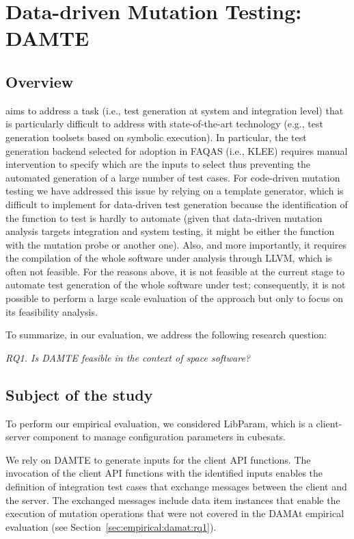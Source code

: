 \clearpage
\section{Data-driven Mutation Testing: DAMTE}
\label{sec:testGeneration:dataDriven}

\subsection{Overview}

\DAMTE aims to address a task (i.e., test generation at system and integration level) that is particularly difficult to address with state-of-the-art technology (e.g., test generation toolsets based on symbolic execution). In particular, the test generation backend selected for adoption in FAQAS (i.e., KLEE) requires manual intervention to specify which are the inputs to select thus preventing the automated generation of a large number of test cases. For code-driven mutation testing we have addressed this issue by relying on a template generator, which is difficult to implement for data-driven test generation because the identification of the function to test is hardly to automate (given that data-driven mutation analysis targets integration and system testing, it might be either the function with the mutation probe or another one). Also, and more importantly, it requires the compilation of the whole software under analysis through LLVM, which is often not feasible. For the reasons above, it is not feasible at the current stage to automate test generation of the whole software under test; consequently, 
it is not possible to perform a large scale evaluation of the approach but only to focus on its feasibility analysis.

To summarize, in our evaluation, we address the following research question:

\emph{RQ1. Is DAMTE feasible in the context of space software?} 



\subsection{Subject of the study}

To perform our empirical evaluation, we considered LibParam, which is a client-server component to manage configuration parameters in cubesats. 

We rely on DAMTE to generate inputs for the \PARAM client API functions. The invocation of the \PARAM client API functions with the identified inputs enables the definition of integration test cases that exchange messages between the \PARAM client and the \PARAM server. The exchanged messages include data item instances that enable the execution of mutation operations that were not covered in the DAMAt empirical evaluation (see Section~\ref{sec:empirical:damat:rq1}).

